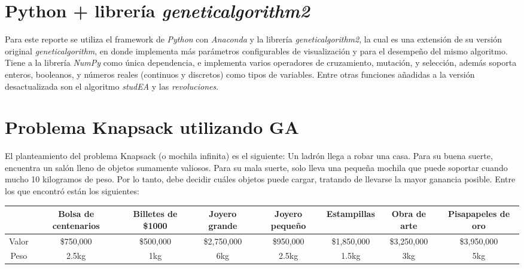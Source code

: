 \documentclass[a4paper, 12pt]{article}
\begin{document}
\section{Python + librería \emph{geneticalgorithm2}}
Para este reporte se utiliza el framework de \emph{Python} con \emph{Anaconda} y la librería \emph{geneticalgorithm2}, la cual es una extensión de su versión original \emph{geneticalgorithm}, en donde implementa más parámetros configurables de visualización y para el desempeño del mismo algoritmo. Tiene a la librería \emph{NumPy} como única dependencia, e implementa varios operadores de cruzamiento, mutación, y selección, además soporta enteros, booleanos, y números reales (continuos y discretos) como tipos de variables. Entre otras funciones añadidas a la versión desactualizada son el algoritmo \emph{studEA} y las \emph{revoluciones}.

\section{Problema Knapsack utilizando GA}
El planteamiento del problema Knapsack (o mochila infinita) es el siguiente: Un ladrón llega a robar una casa. Para su buena suerte, encuentra un salón lleno de objetos sumamente valiosos. Para su mala suerte, solo lleva una pequeña mochila que puede soportar cuando mucho 10 kilogramos de peso. Por lo tanto, debe decidir cuáles objetos puede cargar, tratando de llevarse la mayor ganancia posible. Entre los que encontró están los siguientes:

\begin{table}[!ht]
    \begin{adjustbox}{width=\textwidth}
        \begin{tabular}{|c|c|c|c|c|c|c|c|}
            \hline
                  & Bolsa de centenarios & Billetes de \$1000 & Joyero grande & Joyero pequeño & Estampillas & Obra de arte & Pisapapeles de oro \\
            \hline
            Valor & \$750,000            & \$500,000          & \$2,750,000   & \$950,000      & \$1,850,000 & \$3,250,000  & \$3,950,000        \\
            \hline
            Peso  & 2.5kg                & 1kg                & 6kg           & 2.5kg          & 1.5kg       & 3kg          & 5kg                \\
            \hline
        \end{tabular}
    \end{adjustbox}
\end{table}
\end{document}
